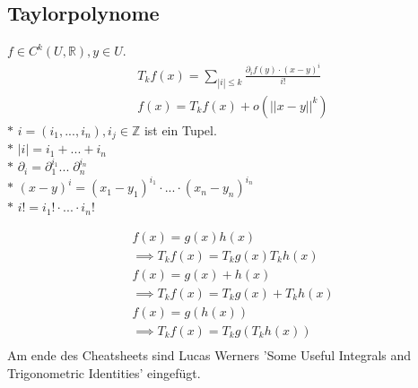 \subsection{Taylorpolynome}
    \(f\in C^k(U,\mathbb R), y\in U\).\\
    \[\begin{array}{cc}
      T_kf(x)=\sum\limits_{|i|\leq k}\frac{\partial_if(y)\cdot(x-y)^i}{i!}\\
      f(x)=T_kf(x)+o(||x-y||^k)
    \end{array}\]
    \(*\) \(i=(i_1,...,i_n), i_j\in\mathbb Z\) ist ein Tupel.\\
    \(*\) \(|i| = i_1+...+i_n\)\\
    \(*\) \(\partial_i=\partial_1^{i_1}...\;\partial_n^{i_n}\)\\
    \(*\) \((x-y)^i=(x_1-y_1)^{i_1}\cdot...\cdot(x_n-y_n)^{i_n}\)\\
    \(*\) \(i!=i_1!\cdot...\cdot i_n!\)

    \[\begin{array}{ll}
      f(x)=g(x)h(x) \\\implies T_kf(x)=T_kg(x)T_kh(x)\\
      f(x)=g(x)+h(x) \\\implies T_kf(x)=T_kg(x)+T_kh(x)\\
      f(x)=g(h(x))   \\\implies T_kf(x)=T_kg(T_kh(x))\\
    \end{array} \]
  Am ende des Cheatsheets sind Lucas Werners 'Some Useful Integrals and 
  Trigonometric Identities' eingefügt.
